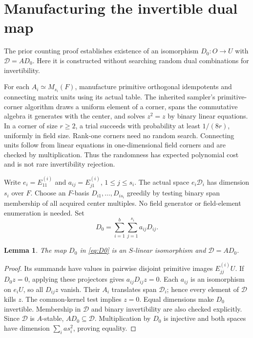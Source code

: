 \documentclass[11pt]{article}
\newtheorem{lemma}[theorem]{Lemma}
\begin{document}
\section{Manufacturing the invertible dual map}

The prior counting proof establishes existence of an isomorphism $D_0:O\to U$
with $\mathcal D=AD_0$. Here it is constructed without searching random
dual combinations for invertibility.

For each $A_i\simeq M_{s_i}(F)$, manufacture primitive orthogonal idempotents
and connecting matrix units using its actual table. The inherited sampler's
primitive-corner algorithm draws a uniform element of a corner, spans the
commutative algebra it generates with the center, and solves $z^2=z$ by
binary linear equations. In a corner of size $r\ge2$, a trial succeeds
with probability at least $1/(8r)$, uniformly in field size. Rank-one corners
need no random search. Connecting units follow from linear equations in
one-dimensional field corners and are checked by multiplication. Thus the
randomness has expected polynomial cost and is not rare invertibility
rejection.

Write $e_i=E^{(i)}_{11}$ and $a_{ij}=E^{(i)}_{j1}$, $1\le j\le s_i$.
The actual space $e_i\mathcal D_i$ has dimension $s_i$ over $F$. Choose an
$F$-basis $D_{i1},\ldots,D_{is_i}$ greedily by testing binary span membership
of all acquired center multiples. No field generator or field-element
enumeration is needed. Set
\begin{equation}\label{eq:D0}
 D_0=\sum_{i=1}^b\sum_{j=1}^{s_i}a_{ij}D_{ij}.
\end{equation}

\begin{lemma}
The map $D_0$ in \eqref{eq:D0} is an $S$-linear isomorphism and
$\mathcal D=AD_0$.
\end{lemma}
\begin{proof}
Its summands have values in pairwise disjoint primitive images
$E^{(i)}_{jj}U$. If $D_0z=0$, applying these projectors gives
$a_{ij}D_{ij}z=0$. Each $a_{ij}$ is an isomorphism on $e_iU$, so all
$D_{ij}z$ vanish. Their $A_i$ translates span $\mathcal D_i$; hence every
element of $\mathcal D$ kills $z$. The common-kernel test implies $z=0$.
Equal dimensions make $D_0$ invertible. Membership in $\mathcal D$ and
binary invertibility are also checked explicitly.
Since $\mathcal D$ is $A$-stable, $AD_0\subseteq\mathcal D$.
Multiplication by $D_0$ is injective and both spaces have dimension
$\sum_i as_i^2$, proving equality.
\end{proof}
\end{document}
